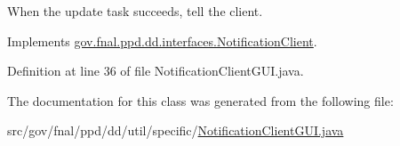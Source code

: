When the update task succeeds, tell the client. 



Implements \hyperlink{interfacegov_1_1fnal_1_1ppd_1_1dd_1_1interfaces_1_1NotificationClient_a6aa9aea7f841d3b3af77302d32aa2197}{gov.\-fnal.\-ppd.\-dd.\-interfaces.\-Notification\-Client}.



Definition at line 36 of file Notification\-Client\-G\-U\-I.\-java.



The documentation for this class was generated from the following file\-:\begin{DoxyCompactItemize}
\item 
src/gov/fnal/ppd/dd/util/specific/\hyperlink{NotificationClientGUI_8java}{Notification\-Client\-G\-U\-I.\-java}\end{DoxyCompactItemize}
